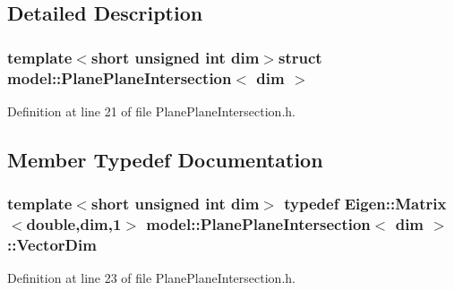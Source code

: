 \subsection{Detailed Description}
\subsubsection*{template$<$short unsigned int dim$>$struct model\+::\+Plane\+Plane\+Intersection$<$ dim $>$}



Definition at line 21 of file Plane\+Plane\+Intersection.\+h.



\subsection{Member Typedef Documentation}
\hypertarget{structmodel_1_1_plane_plane_intersection_a50f4a9f3182b0c739c129bddd9329118}{}
\subsubsection[{Vector\+Dim}]{\setlength{\rightskip}{0pt plus 5cm}template$<$short unsigned int dim$>$ typedef Eigen\+::\+Matrix$<$double,{\bf dim},1$>$ {\bf model\+::\+Plane\+Plane\+Intersection}$<$ {\bf dim} $>$\+::{\bf Vector\+Dim}}\label{structmodel_1_1_plane_plane_intersection_a50f4a9f3182b0c739c129bddd9329118}


Definition at line 23 of file Plane\+Plane\+Intersection.\+h.



